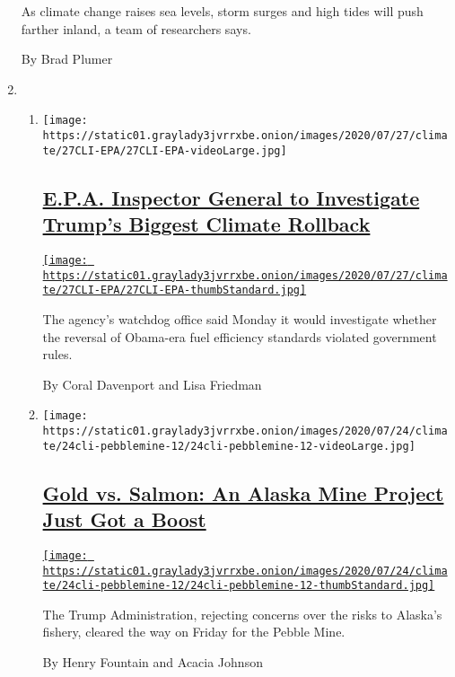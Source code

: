 \begin{enumerate}
  As climate change raises sea levels, storm surges and high tides will
  push farther inland, a team of researchers says.

  By Brad Plumer
\item
  \begin{enumerate}
  \def\labelenumii{\arabic{enumii}.}
  \item
    \texttt{[image: https://static01.graylady3jvrrxbe.onion/images/2020/07/27/climate/27CLI-EPA/27CLI-EPA-videoLarge.jpg]}

    \hypertarget{epa-inspector-general-to-investigate-trumps-biggest-climate-rollback}{%
    \subsection{\texorpdfstring{\href{/2020/07/27/climate/trump-fuel-efficiency-rule.html}{E.P.A.
    Inspector General to Investigate Trump's Biggest Climate
    Rollback}}{E.P.A. Inspector General to Investigate Trump's Biggest Climate Rollback}}\label{epa-inspector-general-to-investigate-trumps-biggest-climate-rollback}}

    \href{/2020/07/27/climate/trump-fuel-efficiency-rule.html}{\texttt{[image: https://static01.graylady3jvrrxbe.onion/images/2020/07/27/climate/27CLI-EPA/27CLI-EPA-thumbStandard.jpg]}}

    The agency's watchdog office said Monday it would investigate
    whether the reversal of Obama-era fuel efficiency standards violated
    government rules.

    By Coral Davenport and Lisa Friedman
  \item
    \texttt{[image: https://static01.graylady3jvrrxbe.onion/images/2020/07/24/climate/24cli-pebblemine-12/24cli-pebblemine-12-videoLarge.jpg]}

    \hypertarget{gold-vs-salmon-an-alaska-mine-project-just-got-a-boost}{%
    \subsection{\texorpdfstring{\href{/2020/07/24/climate/pebble-mine-alaska-environment.html}{Gold
    vs. Salmon: An Alaska Mine Project Just Got a
    Boost}}{Gold vs. Salmon: An Alaska Mine Project Just Got a Boost}}\label{gold-vs-salmon-an-alaska-mine-project-just-got-a-boost}}

    \href{/2020/07/24/climate/pebble-mine-alaska-environment.html}{\texttt{[image: https://static01.graylady3jvrrxbe.onion/images/2020/07/24/climate/24cli-pebblemine-12/24cli-pebblemine-12-thumbStandard.jpg]}}

    The Trump Administration, rejecting concerns over the risks to
    Alaska's fishery, cleared the way on Friday for the Pebble Mine.

    By Henry Fountain and Acacia Johnson
  \end{enumerate}
\end{enumerate}

